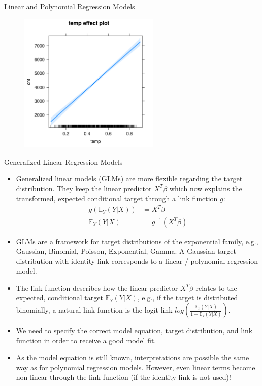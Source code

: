 \documentclass[11pt,compress,t,notes=noshow, xcolor=table]{beamer}
\begin{document}
\begin{vbframe}{Linear and Polynomial Regression Models}
\begin{figure}
  \includegraphics[width = 0.6\textwidth]{figure/lm_effect_plot.png}
\end{figure}
\end{vbframe}


\begin{vbframe}{Generalized Linear Regression Models}

\begin{itemize}
\setlength\itemsep{2em}
\item Generalized linear models (GLMs) are more flexible regarding the target distribution. They keep the linear predictor $X^T\beta$ which now explains the transformed, expected conditional target through a link function $g$: 
\begin{align*}
g\left(\mathbb{E}_Y(Y \vert X)\right) &= X^T\beta \\
\mathbb{E}_Y \left(Y \vert X\right) &= g^{-1}(X^T\beta) 
\end{align*}
\item GLMs are a framework for target distributions of the exponential family, e.g., Gaussian, Binomial, Poisson, Exponential, Gamma. A Gaussian target distribution with identity link corresponds to a linear / polynomial regression model.
\item The link function describes how the linear predictor $X^T\beta$ relates to the expected, conditional target $\mathbb{E}_Y(Y \vert X)$, e.g., if the target is distributed binomially, a natural link function is the logit link $log\left(\frac{\mathbb{E}_Y(Y \vert X)}{1 - \mathbb{E}_Y(Y \vert X)}\right)$.
\item We need to specify the correct model equation, target distribution, and link function in order to receive a good model fit.
\item As the model equation is still known, interpretations are possible the same way as for polynomial regression models. However, even linear terms become non-linear through the link function (if the identity link is not used)!
\end{itemize}
\end{vbframe}
\end{document}

